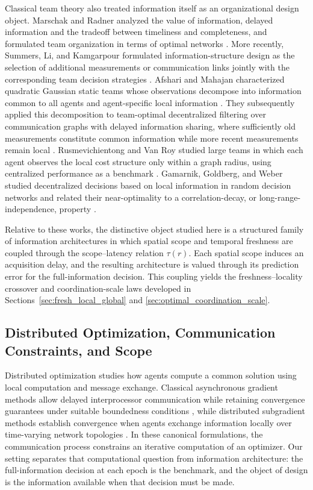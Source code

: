 \documentclass[11pt]{article}
\begin{document}
Classical team theory also treated information itself as an organizational design object. Marschak and Radner analyzed the value of information, delayed information and the tradeoff between timeliness and completeness, and formulated team organization in terms of optimal networks \cite{marschak1972economic}. More recently, Summers, Li, and Kamgarpour formulated information-structure design as the selection of additional measurements or communication links jointly with the corresponding team decision strategies \cite{summers2017information}. Afshari and Mahajan characterized quadratic Gaussian static teams whose observations decompose into information common to all agents and agent-specific local information \cite{afshari2017static}. They subsequently applied this decomposition to team-optimal decentralized filtering over communication graphs with delayed information sharing, where sufficiently old measurements constitute common information while more recent measurements remain local \cite{afshari2018team}. Rusmevichientong and Van Roy studied large teams in which each agent observes the local cost structure only within a graph radius, using centralized performance as a benchmark \cite{rusmevichientong2003decentralized}. Gamarnik, Goldberg, and Weber studied decentralized decisions based on local information in random decision networks and related their near-optimality to a correlation-decay, or long-range-independence, property \cite{gamarnik2014correlation}.

Relative to these works, the distinctive object studied here is a structured family of information architectures in which spatial scope and temporal freshness are coupled through the scope--latency relation $\tau(r)$. Each spatial scope induces an acquisition delay, and the resulting architecture is valued through its prediction error for the full-information decision. This coupling yields the freshness--locality crossover and coordination-scale laws developed in Sections~\ref{sec:fresh_local_global} and \ref{sec:optimal_coordination_scale}.

\subsection{Distributed Optimization, Communication Constraints, and Scope}
\label{subsec:related_distributed_control}

Distributed optimization studies how agents compute a common solution using local computation and message exchange. Classical asynchronous gradient methods allow delayed interprocessor communication while retaining convergence guarantees under suitable boundedness conditions \cite{tsitsiklis1986distributed}, while distributed subgradient methods establish convergence when agents exchange information locally over time-varying network topologies \cite{nedic2009distributed}. In these canonical formulations, the communication process constrains an iterative computation of an optimizer. Our setting separates that computational question from information architecture: the full-information decision at each epoch is the benchmark, and the object of design is the information available when that decision must be made.
\end{document}
